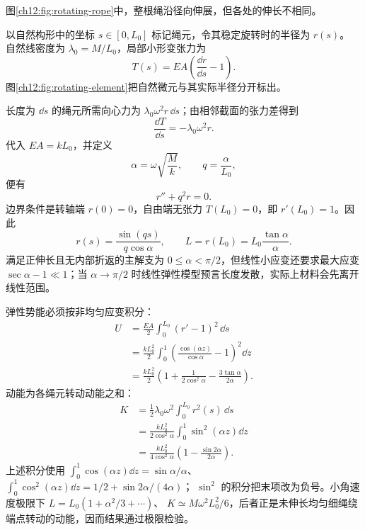 \begin{xesolution}
图\ref{ch12:fig:rotating-rope}中，整根绳沿径向伸展，但各处的伸长不相同。


以自然构形中的坐标 $s\in[0,L_0]$ 标记绳元，令其稳定旋转时的半径为 $r(s)$。
自然线密度为 $\lambda_0=M/L_0$，局部小形变张力为
\[
 T(s)=EA\left(\frac{\dd r}{\dd s}-1\right).
\]
图\ref{ch12:fig:rotating-element}把自然微元与其实际半径分开标出。
\begin{center}
\label{ch12:fig:rotating-element}
\end{center}
长度为 $\dd s$ 的绳元所需向心力为 $\lambda_0\omega^2r\,\dd s$；由相邻截面的张力差得到
\[
 \frac{\dd T}{\dd s}=-\lambda_0\omega^2r.
\]
代入 $EA=kL_0$，并定义
\[
 \alpha=\omega\sqrt{\frac Mk},
 \qquad q=\frac\alpha{L_0},
\]
便有
\[
 r''+q^2r=0.
\]
边界条件是转轴端 $r(0)=0$，自由端无张力 $T(L_0)=0$，即 $r'(L_0)=1$。因此
\[
 r(s)=\frac{\sin(qs)}{q\cos\alpha},
 \qquad
 \boxed{L=r(L_0)=L_0\frac{\tan\alpha}{\alpha}}.
\]
满足正伸长且无内部折返的主解支为 $0\le\alpha<\pi/2$，但线性小应变还要求最大应变 $\sec\alpha-1\ll1$；当 $\alpha\to\pi/2$ 时线性弹性模型预言长度发散，实际上材料会先离开线性范围。

弹性势能必须按非均匀应变积分：
\begin{align*}
 U
 &=\frac{EA}{2}\int_0^{L_0}(r'-1)^2\,\dd s\\
 &=\frac{kL_0^2}{2}\int_0^1\left(\frac{\cos(\alpha z)}{\cos\alpha}-1\right)^2\dd z\\
 &=\boxed{\frac{kL_0^2}{2}
 \left(1+\frac{1}{2\cos^2\alpha}
 -\frac{3\tan\alpha}{2\alpha}\right)}.
\end{align*}
动能为各绳元转动动能之和：
\begin{align*}
 K
 &=\frac12\lambda_0\omega^2\int_0^{L_0}r^2(s)\,\dd s\\
 &=\frac{kL_0^2}{2\cos^2\alpha}\int_0^1\sin^2(\alpha z)\dd z\\
 &=\boxed{\frac{kL_0^2}{4\cos^2\alpha}
 \left(1-\frac{\sin2\alpha}{2\alpha}\right)}.
\end{align*}
上述积分使用
$\int_0^1\cos(\alpha z)\dd z=\sin\alpha/\alpha$、
$\int_0^1\cos^2(\alpha z)\dd z=1/2+\sin2\alpha/(4\alpha)$；
$\sin^2$ 的积分把末项改为负号。小角速度极限下 $L=L_0(1+\alpha^2/3+\cdots)$、
$K\simeq M\omega^2L_0^2/6$，后者正是未伸长均匀细绳绕端点转动的动能，因而结果通过极限检验。
\end{xesolution}

